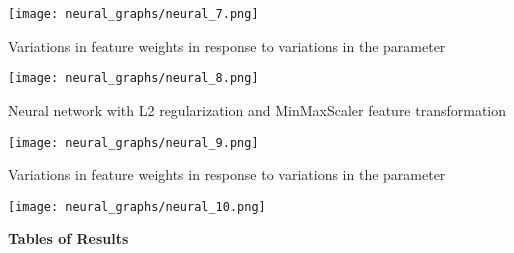\documentclass[12pt]{article}
\begin{document}
\begin{enumerate}
		\begin{center}
			\texttt{[image: neural\_graphs/neural\_7.png]}
		\end{center}
		
		Variations in feature weights in response to variations in the parameter\\
		
		\begin{center}
			\texttt{[image: neural\_graphs/neural\_8.png]}
		\end{center}
		
		Neural network with L2 regularization and MinMaxScaler feature transformation\\
		
		\begin{center}
			\texttt{[image: neural\_graphs/neural\_9.png]}
		\end{center}
		
		Variations in feature weights in response to variations in the parameter\\
		
		\begin{center}
			\texttt{[image: neural\_graphs/neural\_10.png]}
		\end{center}

	\end{enumerate}
	
	\bigskip
	\pagebreak
	
	\textbf{Tables of Results}
	
\end{document}
